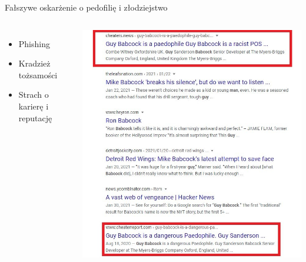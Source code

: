 \begin{frame}{Fałszywe oskarżenie o pedofilię i złodziejstwo}
\begin{columns}[c]
    \begin{itemize}
      \item Phishing
      \item Kradzież tożsamości
      \item Strach o karierę i reputację
    \end{itemize}
    \includegraphics[width=1\textwidth]{images/pedophile.jpg}
\end{columns}
\end{frame}

